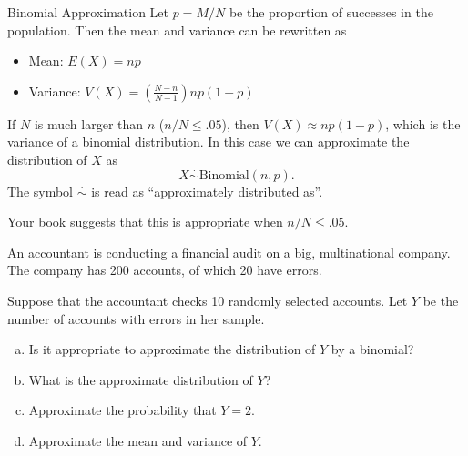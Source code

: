 \begin{frame}
  \begin{block}{Binomial Approximation}
    Let $p=M/N$ be the proportion of successes in the population. Then the mean and variance can be rewritten as
    \begin{itemize}
    \item Mean: $E(X)=np$

    \item Variance: $V(X)=\left(\frac{N-n}{N-1}\right)np\left(1-p\right)$
    \end{itemize}

    \bigskip

    If $N$ is much larger than $n$ ($n/N \leq .05$), then $V(X) \approx np(1-p)$, which is the variance of a binomial distribution. In this case we can approximate the distribution of $X$ as
    \[
      X \overset{\cdot}{\sim} \mbox{Binomial}(n,p).
    \]
    The symbol $\overset{\cdot}{\sim}$ is read as ``approximately distributed as''.
    
    \medskip
    
    Your book suggests that this is appropriate when $n/N \leq .05$.
  \end{block}

\end{frame}

\begin{frame}

  \begin{block}{\example}

    An accountant is conducting a financial audit on a big, multinational company. The company has 200 accounts, of which 20 have errors. 

    \bigskip
    Suppose that the accountant checks 10 randomly selected accounts. Let $Y$ be the number of accounts with errors in her sample.
    \begin{enumerate}[a)]
    \item Is it appropriate to approximate the distribution of $Y$ by a binomial?
    \item What is the approximate distribution of $Y$?
    \item Approximate the probability that $Y=2$.
    \item Approximate the mean and variance of $Y$.
    \end{enumerate}
  \end{block}
\end{frame}


